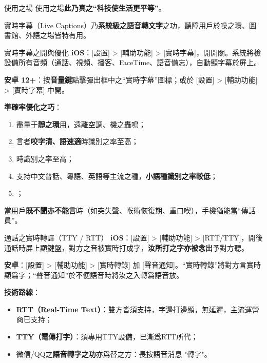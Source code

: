 \begin{tcbpractice}{使用之場}
使用之場\textbf{此乃真之“科技使生活更平等”}。

\end{tcbpractice}


實時字幕（Live Captions）乃\textbf{系統級之語音轉文字}之功，聽障用戶於噪之環、圖書館、外語之場皆特有用。

\begin{tcbinfo}{實時字幕之開與優化}
\textbf{iOS}：[設置] > [輔助功能] > [實時字幕]，開開關。系統將檢設備所有音頻（通話、視頻、播客、FaceTime、語音備忘），自動顯字幕於屏上。

\textbf{安卓 12+}：按\textbf{音量鍵}點擊彈出框中之“實時字幕”圖標；或於 [設置] > [輔助功能] > [實時字幕] 中開。

\textbf{準確率優化之巧}：

\begin{enumerate}
  \item 盡量于\textbf{靜之環}用，遠離空調、機之轟鳴；
  \item 言者\textbf{咬字清、語速適}時識別之率至高；
  \item 時識別之率至高；
  \item 支持中文普話、粵語、英語等主流之種，\textbf{小語種識別之率較低}；
  \item ；
\end{enumerate}

\end{tcbinfo}


當用戶\textbf{既不聞亦不能言}時（如突失聲、喉術恢復期、重口喫），手機猶能當“傳話員”。

\begin{tcbinfo}{通話之實時轉譯（TTY / RTT）}
\textbf{iOS}：[設置] > [輔助功能] > [RTT/TTY]，開後通話時屏上顯鍵盤，對方之音被實時打成字，\textbf{汝所打之字亦被念出}予對方聽。

\textbf{安卓}：[設置] > [輔助功能] > [實時轉錄] 加 [聲音通知]。“實時轉錄”將對方言實時顯爲字；“聲音通知”於不便語音時將汝之入轉爲語音放。

\textbf{技術路線}：

\begin{itemize}
  \item \textbf{RTT（Real-Time Text）}：雙方皆須支持，字邊打邊顯，無延遲，主流運營商已支持；
  \item \textbf{TTY（電傳打字）}：須專用TTY設備，已漸爲RTT所代；
  \item 微信/QQ之\textbf{語音轉字之功}亦爲替之方：長按語音消息 "轉字"。
\end{itemize}

\end{tcbinfo}

